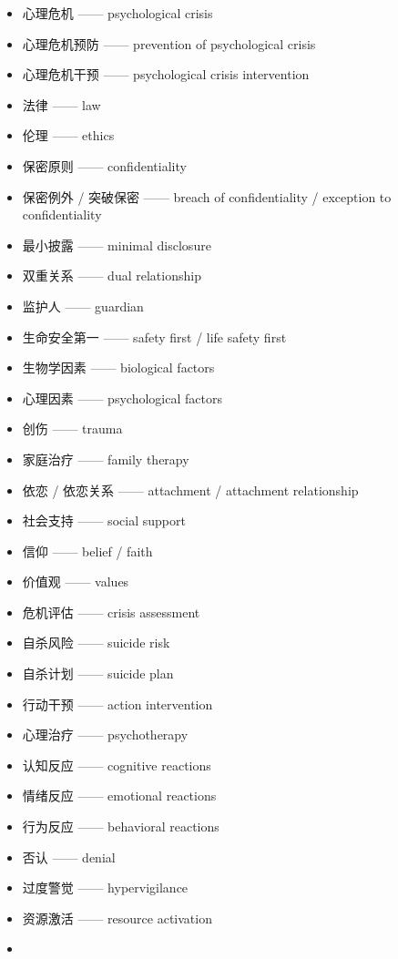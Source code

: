 \documentclass[
  chinese,
  9pt,
  a4paper,
]{ctexart}
\providecommand{\tightlist}{%
  \setlength{\itemsep}{0pt}\setlength{\parskip}{0pt}}
\begin{document}
\begin{itemize}
\tightlist
\item
  心理危机 ------ psychological crisis
\item
  心理危机预防 ------ prevention of psychological crisis
\item
  心理危机干预 ------ psychological crisis intervention
\item
  法律 ------ law
\item
  伦理 ------ ethics
\item
  保密原则 ------ confidentiality
\item
  保密例外 / 突破保密 ------ breach of confidentiality / exception to
  confidentiality
\item
  最小披露 ------ minimal disclosure
\item
  双重关系 ------ dual relationship
\item
  监护人 ------ guardian
\item
  生命安全第一 ------ safety first / life safety first
\item
  生物学因素 ------ biological factors
\item
  心理因素 ------ psychological factors
\item
  创伤 ------ trauma
\item
  家庭治疗 ------ family therapy
\item
  依恋 / 依恋关系 ------ attachment / attachment relationship
\item
  社会支持 ------ social support
\item
  信仰 ------ belief / faith
\item
  价值观 ------ values
\item
  危机评估 ------ crisis assessment
\item
  自杀风险 ------ suicide risk
\item
  自杀计划 ------ suicide plan
\item
  行动干预 ------ action intervention
\item
  心理治疗 ------ psychotherapy
\item
  认知反应 ------ cognitive reactions
\item
  情绪反应 ------ emotional reactions
\item
  行为反应 ------ behavioral reactions
\item
  否认 ------ denial
\item
  过度警觉 ------ hypervigilance
\item
  资源激活 ------ resource activation
\item

\end{itemize}
\end{document}

